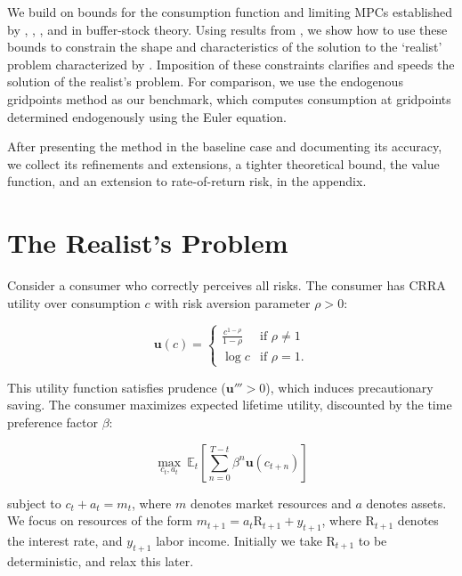 \documentclass[preprint,authoryear]{elsarticle}
\newcommand{\mNrm}{m}
\newcommand{\cNrm}{c}
\newcommand{\CRRA}{\rho}
\newcommand{\uFunc}{\mathbf{u}}
\newcommand{\DiscFac}{\beta}
\newcommand{\Ex}{\mathbf{\mathbb{E}}}
\newcommand{\aNrm}{a}
\newcommand{\Rfree}{\text{R}}
\newcommand{\yNrm}{y}
\begin{document}
We build on bounds for the consumption function and limiting MPCs established by \citet{StachurskiToda2019JET}, \citet{MST2020JET}, \citet{Carroll2001MPCBound}, and \citet{MaToda2021SavingRateRich} in buffer-stock theory. Using results from \citet{CarrollShanker2024}, we show how to use these bounds to constrain the shape and characteristics of the solution to the `realist' problem characterized by \citet{Carroll1997}. Imposition of these constraints clarifies and speeds the solution of the realist's problem. For comparison, we use the endogenous gridpoints method \citep{carrollEGM} as our benchmark, which computes consumption at gridpoints determined endogenously using the Euler equation.

After presenting the method in the baseline case and documenting its accuracy, we collect its refinements and extensions, a tighter theoretical bound, the value function, and an extension to rate-of-return risk, in the appendix.

\section{The Realist's Problem}

Consider a consumer who correctly perceives all risks. The consumer has CRRA utility over consumption $\cNrm$ with risk aversion parameter $\CRRA > 0$:

\begin{equation}
\label{eq:UtilityFunc}
\uFunc(\cNrm) = \begin{cases}
\frac{\cNrm^{1-\CRRA}}{1-\CRRA} & \text{if } \CRRA \neq 1 \\
\log \cNrm & \text{if } \CRRA = 1.
\end{cases}
\end{equation}

This utility function satisfies prudence ($\uFunc''' > 0$), which induces precautionary saving. The consumer maximizes expected lifetime utility, discounted by the time preference factor $\DiscFac$:

\begin{equation}
\label{eq:MaxProb}
\max_{\cNrm_t,\aNrm_t}~\Ex_{t}\left[\sum_{n=0}^{T-t}\DiscFac^{n} \uFunc(\cNrm_{t+n})\right]
\end{equation}

subject to $\cNrm_{t} + \aNrm_{t} = \mNrm_{t}$, where $\mNrm$ denotes market resources and $\aNrm$ denotes assets. We focus on resources of the form $\mNrm_{t+1} = \aNrm_{t}\Rfree_{t+1} + \yNrm_{t+1}$, where $\Rfree_{t+1}$ denotes the interest rate, and $\yNrm_{t+1}$ labor income.  Initially we take $\Rfree_{t+1}$ to be deterministic, and relax this later.
\end{document}
